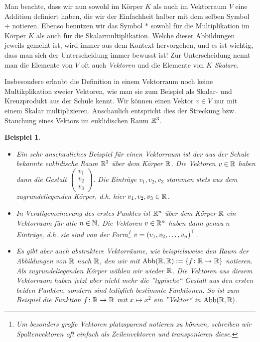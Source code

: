 \documentclass[ngerman, a4paper, 12pt]{scrartcl}
\newcounter{themcount}
\theoremstyle{plain}
\newtheorem{beispiel}[themcount]{Beispiel}
\theoremstyle{proofstyle}
\begin{document}
	Man beachte, dass wir nun sowohl im Körper $K$ als auch im Vektorraum $V$ eine Addition definiert haben, die wir der Einfachheit halber mit dem selben Symbol $+$ notieren. Ebenso benutzen wir das Symbol $*$ sowohl für die Multiplikation im Körper $K$ als auch für die Skalarmultiplikation. Welche dieser Abbildungen jeweils gemeint ist, wird immer aus dem Kontext hervorgehen, und es ist wichtig, dass man sich der Unterscheidung immer bewusst ist! Zur Unterscheidung nennt man die Elemente von $V$ oft auch \textit{Vektoren} und die Elemente von $K$ \textit{Skalare}. 

	Insbesondere erlaubt die Definition in einem Vektorraum noch keine Multikplikation zweier Vektoren, wie man sie zum Beispiel als Skalar- und Kreuzprodukt aus der Schule kennt. Wir können einen Vektor $v \in V$ nur mit einem Skalar multiplizieren. Anschaulich entspricht dies der Streckung bzw. Stauchung eines Vektors im euklidischen Raum $\mathbb{R}^3$.
	
	\begin{beispiel}
		\begin{itemize}
			\item Ein sehr anschauliches Beispiel für einen Vektorraum ist der aus der Schule bekannte euklidische Raum $\mathbb{R}^3$ über dem Körper $\mathbb{R}$. Die Vektoren $v \in \mathbb{R}$ haben dann die Gestalt $\left( \begin{smallmatrix} v_1 \\ v_2 \\ v_3 \end{smallmatrix} \right)$. Die Einträge $v_1, v_2, v_3$ stammen stets aus dem zugrundeliegenden Körper, d.h. hier $v_1, v_2, v_3 \in \mathbb{R}$.
			\item In Verallgemeinerung des erstes Punktes ist $\mathbb{R}^n$ über dem Körper $\mathbb{R}$ ein Vektorraum für alle $n \in \mathbb{N}$. Die Vektoren $v \in \mathbb{R}^n$ haben dann genau $n$ Einträge, d.h. sie sind von der Form\footnote{Um besonders große Vektoren platzsparend notieren zu können, schreiben wir Spaltenvektoren oft einfach als Zeilenvektoren und transponieren diese.} $v = \left( v_1, v_2, \dots, v_n \right)^{\top}$.
			\item Es gibt aber auch abstraktere Vektorräume, wie beispielsweise den Raum der Abbildungen von $\mathbb{R}$ nach $\mathbb{R}$, den wir mit $\Abb(\R,\R) \defeq \menge{\abb{f}{\R}{\R}}$ notieren. Als zugrundeliegenden Körper wählen wir wieder $\mathbb{R}$. Die Vektoren aus diesem Vektorraum haben jetzt aber nicht mehr die ''typische`` Gestalt aus den ersten beiden Punkten, sondern sind lediglich bestimmte Funktionen. So ist zum Beispiel die Funktion $\abb{f}{\R}{\R}$ mit $x \mapsto x^2$ ein ''Vektor`` in $\operatorname{Abb}(\mathbb{R},\mathbb{R})$.
		\end{itemize}
	\end{beispiel}
\end{document}
